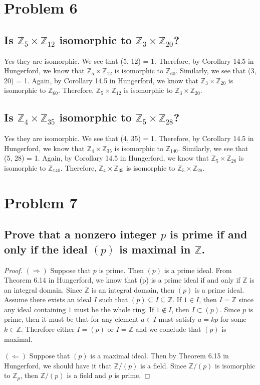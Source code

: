 \documentclass{article}
\theoremstyle{plain} %
\theoremstyle{definition} %
\begin{document}
\section*{Problem 6}
\subsection*{Is $\mathbb{Z}_5 \times \mathbb{Z}_{12}$ isomorphic to $\mathbb{Z}_3 \times \mathbb{Z}_{20}$?}
Yes they are isomorphic.
We see that (5, 12) = 1. Therefore, by Corollary 14.5 in Hungerford, we know that $\mathbb{Z}_5 \times \mathbb{Z}_{12}$ is isomorphic to $\mathbb{Z}_{60}$.
Similarly, we see that (3, 20) = 1. Again, by Corollary 14.5 in Hungerford, we know that $\mathbb{Z}_3 \times \mathbb{Z}_{20}$ is isomorphic to $\mathbb{Z}_{60}$.
Therefore, $\mathbb{Z}_5 \times \mathbb{Z}_{12}$ is isomorphic to $\mathbb{Z}_3 \times \mathbb{Z}_{20}$.

\subsection*{Is $\mathbb{Z}_4 \times \mathbb{Z}_{35}$ isomorphic to $\mathbb{Z}_5 \times \mathbb{Z}_{28}$?}
Yes they are isomorphic. 
We see that (4, 35) = 1. Therefore, by Corollary 14.5 in Hungerford, we know that $\mathbb{Z}_4 \times \mathbb{Z}_{35}$ is isomorphic to $\mathbb{Z}_{140}$.
Similarly, we see that (5, 28) = 1. Again, by Corollary 14.5 in Hungerford, we know that $\mathbb{Z}_5 \times \mathbb{Z}_{28}$ is isomorphic to $\mathbb{Z}_{140}$.
Therefore, $\mathbb{Z}_4 \times \mathbb{Z}_{35}$ is isomorphic to $\mathbb{Z}_5 \times \mathbb{Z}_{28}$.
\section*{Problem 7}
\subsection*{Prove that a nonzero integer $p$ is prime if and only if the ideal $(p)$ is
maximal in $\mathbb{Z}$.}
\begin{proof}
    $(\Rightarrow)$ Suppose that $p$ is prime. Then $(p)$ is a prime ideal. From Theorem 6.14 in Hungerford, we know that
    (p) is a prime ideal if and only if $\mathbb{Z}$ is an integral domain.
    Since $\mathbb{Z}$ is an integral domain, then $(p)$ is a prime ideal. Assume there exists an ideal $I$ such that $(p) \subseteq I \subseteq \mathbb{Z}$.
    If $1 \in I$, then $I = \mathbb{Z}$ since any ideal containing $1$ must be the whole ring. If $1 \notin I$, then $I \subset (p)$. Since $p$ is prime, then
    it must be that for any element $a \in I$ must satisfy $a = kp$ for some $k \in \mathbb{Z}$.
    Therefore either $I = (p)$ or $I = \mathbb{Z}$ and we conclude that $(p)$ is maximal.
    
    $(\Leftarrow)$ Suppose that $(p)$ is a maximal ideal. Then by Theorem 6.15 in Hungerford, we should have
    it that $\mathbb{Z}/(p)$ is a field. Since $\mathbb{Z}/(p)$ is isomorphic to $\mathbb{Z}_p$, then $\mathbb{Z}/(p)$ is a field
    and $p$ is prime.
\end{proof}
\end{document}
